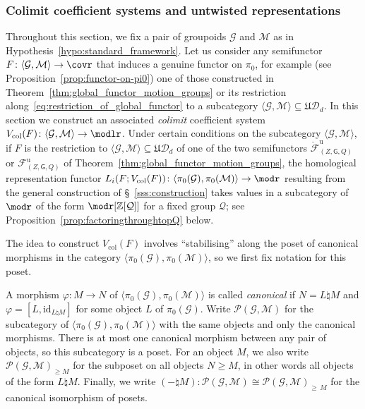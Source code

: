 \documentclass[AHL,Unicode,published]{cedram}
\newcommand{\id}{\mathrm{id}}
\newcommand{\Int}{\mathring}
\newcommand{\col}{\mathrm{col}}
\newcommand{\unt}{\mathrm{u}}
\newcommand{\fU}{\ensuremath{\mathfrak{U}}}
\newcommand{\sG}{\mathsf{G}}
\newcommand{\cD}{\mathcal{D}}
\newcommand{\cF}{\mathcal{F}}
\newcommand{\cG}{\mathcal{G}}
\newcommand{\cM}{\mathcal{M}}
\newcommand{\cP}{\mathcal{P}}
\newcommand{\cQ}{\mathcal{Q}}
\newcommand{\bZ}{\mathbb{Z}}
\renewcommand{\geq}{\geqslant}
\begin{document}
\subsubsection{Colimit coefficient systems and untwisted representations}\label{sss:col_coeff_unwtisted_rep}

Throughout this section, we fix a pair of groupoids $\cG$ and $\cM$ as in Hypothesis~\ref{hypo:standard_framework}. Let us consider any semifunctor $F \colon \langle \cG, \cM \rangle \to \covr$ that induces a genuine functor on $\pi_{0}$, for example (see Proposition~\ref{prop:functor-on-pi0}) one of those constructed in Theorem~\ref{thm:global_functor_motion_groups} or its restriction along~\eqref{eq:restriction_of_global_functor} to a subcategory $\langle \cG, \cM \rangle \subseteq \fU\cD_{d}$. In this section we construct an associated \emph{colimit} coefficient system $V_{\col}(F) \colon \langle \cG, \cM \rangle \to \modlr$. Under certain conditions on the subcategory $\langle \cG, \cM \rangle$, if $F$ is the restriction to $\langle \cG, \cM \rangle \subseteq \fU\cD_{d}$ of one of the two semifunctors $\Int{\cF}^{\unt}_{(Z,\sG,Q)}$ or $\cF^{\unt}_{(Z,\sG,Q)}$ of Theorem~\ref{thm:global_functor_motion_groups}, the homological representation functor $L_i(F;V_{\col}(F)) \colon \langle \pi_{0}(\cG), \pi_{0}(\cM) \rangle \to \modr$ resulting from the general construction of \S~\ref{sss:construction} takes values in a subcategory of $\modr$ of the form $\modr[{\bZ[\cQ]}]$ for a fixed group $\cQ$; see Proposition~\ref{prop:factoringthroughtopQ} below.

The idea to construct $V_{\col}(F)$ involves ``stabilising'' along the poset of canonical morphisms in the category $\langle \pi_{0}(\cG), \pi_{0}(\cM) \rangle$, so we first fix notation for this poset.

\begin{defi}\label{def:underlying-poset}
A morphism $\varphi \colon M \to N$ of $\langle \pi_{0}(\cG), \pi_{0}(\cM) \rangle$ is called \emph{canonical} if $N = L \natural M$ and $\varphi = [L,\id_{L \natural M}]$ for some object $L$ of $\pi_{0}(\cG)$. Write $\cP(\cG,\cM)$ for the subcategory of $\langle \pi_{0}(\cG), \pi_{0}(\cM) \rangle$ with the same objects and only the canonical morphisms. There is at most one canonical morphism between any pair of objects, so this subcategory is a poset. For an object $M$, we also write $\cP(\cG,\cM)_{\geq M}$ for the subposet on all objects $N \geq M$, in other words all objects of the form $L \natural M$. Finally, we write $(- \natural M) \colon \cP(\cG,\cM) \cong \cP(\cG,\cM)_{\geq\,M}$ for the canonical isomorphism of posets.
\end{defi}
\end{document}
